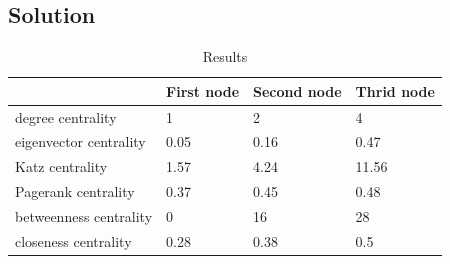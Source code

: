 \documentclass{article}
\begin{document}
\subsection*{Solution}
\begin{table}[h]
        \caption{Results}
        \begin{center}
            \begin{tabular}{llll}
                \hline
                & First node& Second node& Thrid node\\
                \hline
                degree centrality&1&2&4\\
                eigenvector centrality&0.05&0.16&0.47\\
                Katz centrality&1.57&4.24&11.56\\
                Pagerank centrality&0.37&0.45&0.48\\
                betweenness centrality&0&16&28\\
                closeness centrality&0.28&0.38&0.5\\
                \hline
            \end{tabular}
        \end{center}
    \end{table}


\clearpage %
\end{document}
